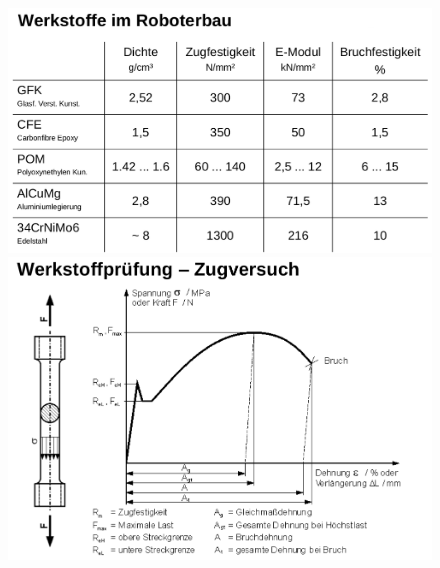 \begin{figure}[!htb]
    \centering
    \begin{minipage}{.5\textwidth}
        \centering
        \includegraphics[width=\textwidth]{figures/werkstoffe.png}
    \end{minipage}%
    \begin{minipage}{0.5\textwidth}
        \centering
        \includegraphics[width=\textwidth]{figures/werkstoffpruefung.png}
    \end{minipage}
\end{figure}

